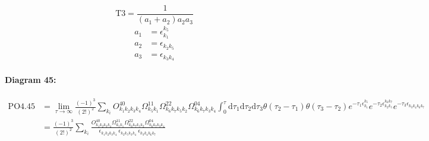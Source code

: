 \documentclass[10pt,a4paper]{article}
\begin{document}
\begin{equation}
\text{T}3 = \frac{1}{(a_1+ a_2)a_2a_3}\end{equation}
\begin{align*}
a_1 &= \epsilon^{k_{5}}_{k_{1}}\\
a_2 &= \epsilon^{}_{k_{2}k_{5}}\\
a_3 &= \epsilon^{}_{k_{3}k_{4}}
\end{align*}
\paragraph{Diagram 45:}
\begin{align}
\text{PO}4.45
&= \lim\limits_{\tau \to \infty}\frac{(-1)^3 }{(2!)^2}\sum_{k_i}O^{40}_{k_{1}k_{2}k_{3}k_{4}} \Omega^{11}_{k_{5}k_{1}} \Omega^{22}_{k_{6}k_{7}k_{5}k_{2}} \Omega^{04}_{k_{6}k_{7}k_{3}k_{4}} \int_{0}^{\tau}\mathrm{d}\tau_1\mathrm{d}\tau_2\mathrm{d}\tau_3\theta(\tau_2-\tau_1) \theta(\tau_3-\tau_2) e^{-\tau_1 \epsilon^{k_{5}}_{k_{1}}}e^{-\tau_2 \epsilon^{k_{6}k_{7}}_{k_{2}k_{5}}}e^{-\tau_3 \epsilon^{}_{k_{3}k_{4}k_{6}k_{7}}}
 \nonumber \\
&= \frac{(-1)^3 }{(2!)^2}\sum_{k_i}\frac{O^{40}_{k_{1}k_{2}k_{3}k_{4}} \Omega^{11}_{k_{5}k_{1}} \Omega^{22}_{k_{6}k_{7}k_{5}k_{2}} \Omega^{04}_{k_{6}k_{7}k_{3}k_{4}} }{\epsilon^{}_{k_{1}k_{2}k_{3}k_{4}}\ \epsilon^{}_{k_{2}k_{5}k_{3}k_{4}}\ \epsilon^{}_{k_{3}k_{4}k_{6}k_{7}}\ } 
\end{align}
\end{document}

